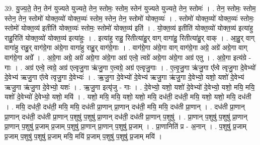 \documentclass[17pt]{extarticle}
\begin{document}
39. यु॒ज्य॒ते॒ तेन॒ तेन॑ युज्यते युज्यते॒ तेन॒ स्तोमः॒ स्तोम॒ स्तेन॑ युज्यते युज्यते॒ तेन॒ स्तोमः॑ । . तेन॒ स्तोमः॒ स्तोम॒ स्तेन॒ तेन॒ स्तोमो॑ योक्त॒व्यो॑ योक्त॒व्यः॑ स्तोम॒ स्तेन॒ तेन॒ स्तोमो॑ योक्त॒व्यः॑ । . स्तोमो॑ योक्त॒व्यो॑ योक्त॒व्यः॑ स्तोमः॒ स्तोमो॑ योक्त॒व्य॑ इतीति॑ योक्त॒व्यः॑ स्तोमः॒ स्तोमो॑ योक्त॒व्य॑ इति॑ । . यो॒क्त॒व्य॑ इतीति॑ योक्त॒व्यो॑ योक्त॒व्य॑ इत्या॑हु राहु॒रिति॑ योक्त॒व्यो॑ योक्त॒व्य॑ इत्या॑हुः । . इत्या॑हु राहु॒ रितीत्या॑हु॒र् वाग् वागा॑हु॒ रितीत्या॑हु॒र् वाक् । . आ॒हु॒र् वाग् वागा॑हु राहु॒र् वाग॑ग्रे॒गा अ॑ग्रे॒गा वागा॑हु राहु॒र् वाग॑ग्रे॒गाः । . वाग॑ग्रे॒गा अ॑ग्रे॒गा वाग् वाग॑ग्रे॒गा अग्रे॒ अग्रे॑ अग्रे॒गा वाग् वाग॑ग्रे॒गा अग्रे᳚ । . अ॒ग्रे॒गा अग्रे॒ अग्रे॑ अग्रे॒गा अ॑ग्रे॒गा अग्र॑ एत्वे॒ त्वग्रे॑ अग्रे॒गा अ॑ग्रे॒गा अग्र॑ एतु । . अ॒ग्रे॒गा इत्य॑ग्रे - गाः । . अग्र॑ एत्वे॒ त्वग्रे॒ अग्र॑ एत्वृजु॒गा ऋ॑जु॒गा ए॒त्वग्रे॒ अग्र॑ एत्वृजु॒गाः । . ए॒त्वृ॒जु॒गा ऋ॑जु॒गा ए᳚त्वे त्वृजु॒गा दे॒वेभ्यो॑ दे॒वेभ्य॑ ऋजु॒गा ए᳚त्वे त्वृजु॒गा दे॒वेभ्यः॑ । . ऋ॒जु॒गा दे॒वेभ्यो॑ दे॒वेभ्य॑ ऋजु॒गा ऋ॑जु॒गा दे॒वेभ्यो॒ यशो॒ यशो॑ दे॒वेभ्य॑ ऋजु॒गा ऋ॑जु॒गा दे॒वेभ्यो॒ यशः॑ । . ऋ॒जु॒गा इत्यृ॑जु - गाः । . दे॒वेभ्यो॒ यशो॒ यशो॑ दे॒वेभ्यो॑ दे॒वेभ्यो॒ यशो॒ मयि॒ मयि॒ यशो॑ दे॒वेभ्यो॑ दे॒वेभ्यो॒ यशो॒ मयि॑ । . यशो॒ मयि॒ मयि॒ यशो॒ यशो॒ मयि॒ दध॑ती॒ दध॑ती॒ मयि॒ यशो॒ यशो॒ मयि॒ दध॑ती । . मयि॒ दध॑ती॒ दध॑ती॒ मयि॒ मयि॒ दध॑ती प्रा॒णान् प्रा॒णान् दध॑ती॒ मयि॒ मयि॒ दध॑ती प्रा॒णान् । . दध॑ती प्रा॒णान् प्रा॒णान् दध॑ती॒ दध॑ती प्रा॒णान् प॒शुषु॑ प॒शुषु॑ प्रा॒णान् दध॑ती॒ दध॑ती प्रा॒णान् प॒शुषु॑ । . प्रा॒णान् प॒शुषु॑ प॒शुषु॑ प्रा॒णान् प्रा॒णान् प॒शुषु॑ प्र॒जाम् प्र॒जाम् प॒शुषु॑ प्रा॒णान् प्रा॒णान् प॒शुषु॑ प्र॒जाम् । . प्रा॒णानिति॑ प्र - अ॒नान् । . प॒शुषु॑ प्र॒जाम् प्र॒जाम् प॒शुषु॑ प॒शुषु॑ प्र॒जाम् मयि॒ मयि॑ प्र॒जाम् प॒शुषु॑ प॒शुषु॑ प्र॒जाम् मयि॑ । \newline
\end{document}

